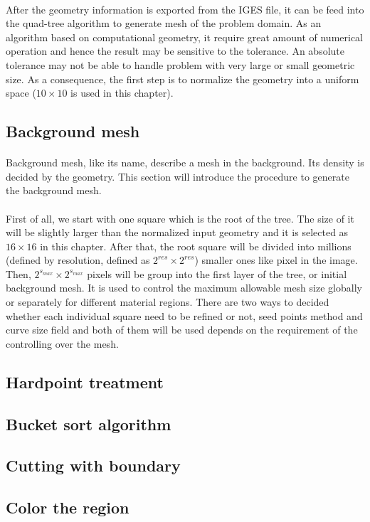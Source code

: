 \paragraph{}
After the geometry information is exported from the IGES file, it can be feed into the quad-tree algorithm to generate mesh of the problem domain.
As an algorithm based on computational geometry, it require great amount of numerical operation and hence the result may be sensitive to the tolerance.
An absolute tolerance may not be able to handle problem with very large or small geometric size.
As a consequence, the first step is to normalize the geometry into a uniform space ($10\times10$ is used in this chapter).

\subsection{Background mesh}
\paragraph{}
Background mesh, like its name, describe a mesh in the background. %
Its density is decided by the geometry.
This section will introduce the procedure to generate the background mesh.
\paragraph{}
First of all, we start with one square which is the root of the tree.
The size of it will be slightly larger than the normalized input geometry and it is selected as $16 \times 16$ in this chapter.
After that, the root square will be divided into millions (defined by resolution, defined as $2^{res} \times 2^{res}$) smaller ones like pixel in the image.
Then, $2^{s_{max}} \times 2^{s_{max}}$ pixels will be group into the first layer of the tree, or initial background mesh.
It is used to control the maximum allowable mesh size globally or separately for different material regions.
There are two ways to decided whether each individual square need to be refined or not, seed points method and curve size field and both of them will be used depends on the requirement of the controlling over the mesh.

\paragraph{}


\subsection{Hardpoint treatment}

\subsection{Bucket sort algorithm}

\subsection{Cutting with boundary}

\subsection{Color the region}
